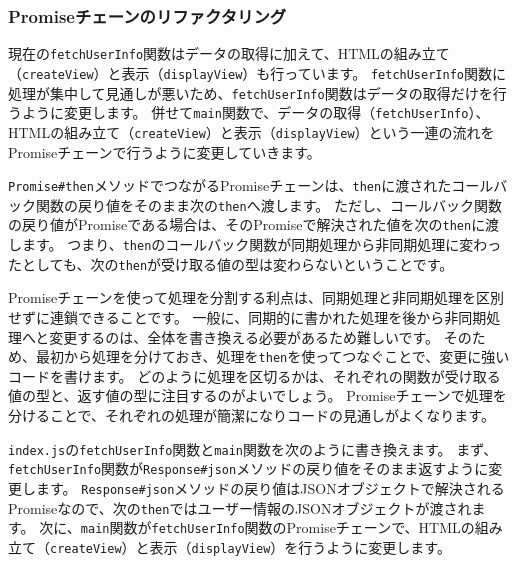 \hypertarget{refactor-promise-chain}{%
\subsubsection{Promiseチェーンのリファクタリング}\label{refactor-promise-chain}}

現在の\texttt{fetchUserInfo}関数はデータの取得に加えて、HTMLの組み立て（\texttt{createView}）と表示（\texttt{displayView}）も行っています。
\texttt{fetchUserInfo}関数に処理が集中して見通しが悪いため、\texttt{fetchUserInfo}関数はデータの取得だけを行うように変更します。
併せて\texttt{main}関数で、データの取得（\texttt{fetchUserInfo}）、HTMLの組み立て（\texttt{createView}）と表示（\texttt{displayView}）という一連の流れをPromiseチェーンで行うように変更していきます。

\texttt{Promise\#then}メソッドでつながるPromiseチェーンは、\texttt{then}に渡されたコールバック関数の戻り値をそのまま次の\texttt{then}へ渡します。
ただし、コールバック関数の戻り値がPromiseである場合は、そのPromiseで解決された値を次の\texttt{then}に渡します。
つまり、\texttt{then}のコールバック関数が同期処理から非同期処理に変わったとしても、次の\texttt{then}が受け取る値の型は変わらないということです。

Promiseチェーンを使って処理を分割する利点は、同期処理と非同期処理を区別せずに連鎖できることです。
一般に、同期的に書かれた処理を後から非同期処理へと変更するのは、全体を書き換える必要があるため難しいです。
そのため、最初から処理を分けておき、処理を\texttt{then}を使ってつなぐことで、変更に強いコードを書けます。
どのように処理を区切るかは、それぞれの関数が受け取る値の型と、返す値の型に注目するのがよいでしょう。
Promiseチェーンで処理を分けることで、それぞれの処理が簡潔になりコードの見通しがよくなります。

\texttt{index.js}の\texttt{fetchUserInfo}関数と\texttt{main}関数を次のように書き換えます。
まず、\texttt{fetchUserInfo}関数が\texttt{Response\#json}メソッドの戻り値をそのまま返すように変更します。
\texttt{Response\#json}メソッドの戻り値はJSONオブジェクトで解決されるPromiseなので、次の\texttt{then}ではユーザー情報のJSONオブジェクトが渡されます。
次に、\texttt{main}関数が\texttt{fetchUserInfo}関数のPromiseチェーンで、HTMLの組み立て（\texttt{createView}）と表示（\texttt{displayView}）を行うように変更します。

